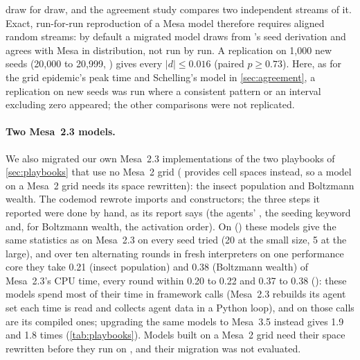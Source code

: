 draw for draw, and the agreement study compares two independent streams of it. Exact,
run-for-run reproduction of a Mesa model therefore requires aligned random streams: by default
a migrated model draws  from \modelly{}'s seed derivation and agrees with
Mesa in distribution, not run by run. A replication
on 1,000 new seeds (20,000 to 20,999, )
gives every $|d| \le 0.016$ (paired $p \ge 0.73$). Here, as for the grid epidemic's peak time
and Schelling's model in \cref{sec:agreement}, a replication on new seeds was run where a
consistent pattern or an interval excluding zero appeared; the other comparisons were not
replicated.

\begin{table}[tbp]
  \centering
  \small
  \caption{Mesa~3.5's own examples on Mesa and, migrated by the codemod, on \modelly{}: median
  CPU time of the steps over ten alternating rounds, \modelly{}'s ratio and its per-round
  range, and the agreement of the model reporters over 100 shared seeds (statistics compared,
  equivalent within $0.5\,s_p$ by paired TOST, lowest Holm-corrected paired $p$). The script
   generates it from .}
  \label{tab:mesa-examples}
  \setlength{\tabcolsep}{4pt}
  
\end{table}

\paragraph{Two Mesa~2.3 models.} We also migrated our own Mesa~2.3 implementations of the two
playbooks of \cref{sec:playbooks} that use no Mesa~2 grid (\modelly{} provides cell spaces
instead, so a model on a Mesa~2 grid needs its space rewritten): the insect population and
Boltzmann wealth. The codemod rewrote imports and constructors; the three steps it reported
were done by hand, as its report says (the agents' , the seeding keyword and,
for Boltzmann wealth, the activation order). On \modelly{} ()
these models give the same statistics as on Mesa~2.3 on every seed tried (20 at the small size, 5 at
the large), and over ten alternating rounds in fresh interpreters on one performance core they
take 0.21 (insect population) and 0.38 (Boltzmann wealth) of Mesa~2.3's CPU time, every round
within 0.20 to 0.22 and 0.37 to 0.38 (): these models spend
most of their time in framework calls (Mesa~2.3 rebuilds its agent set each time
 is read and collects agent data in a Python loop), and on \modelly{} those
calls are its compiled ones; upgrading the same models to Mesa~3.5 instead gives 1.9 and 1.8
times (\cref{tab:playbooks}). Models built on a Mesa~2 grid need their space rewritten before
they run on \modelly{}, and their migration was not evaluated.

